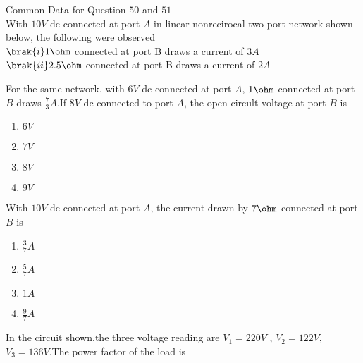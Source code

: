        Common Data for Question $50$ and $51$\\
         With $10 V$ dc connected at port $A$ in linear nonrecirocal two-port network shown below, the following were observed\\
         $\brak{i}1\ohm$ connected at port B draws a current of $3 A$\\
           $\brak{ii}2.5\ohm$ connected at port B draws a current of $2 A$\\
           
\item For the same network, with $6 V$ dc connected at port $A$, $1\ohm$ connected at port $B$ draws $\frac{7}{3} A$.If $8 V$ dc connected to port $A$, the open circult voltage at port $B$ is 
\begin{enumerate}
    \item$6 V$\\
    \item$7 V$\\
    \item$8 V$\\
    \item$9 V$
    \end{enumerate}
    \item With $10 V$ dc connected at port $A$, the current drawn by $7\ohm$ connected at port $B$ is
    \begin{enumerate}
        \item$\frac{3}{7}A$\\
         \item$\frac{5}{7}A$\\
        \item$1 A$\\
        \item$\frac{9}{7}A$
    \end{enumerate}
    \item In the circuit shown,the three voltage reading are $V_{1} = 220 V$ , $V_{2} = 122 V$, $V_{3} = 136 V$.The power factor of the load is\\
